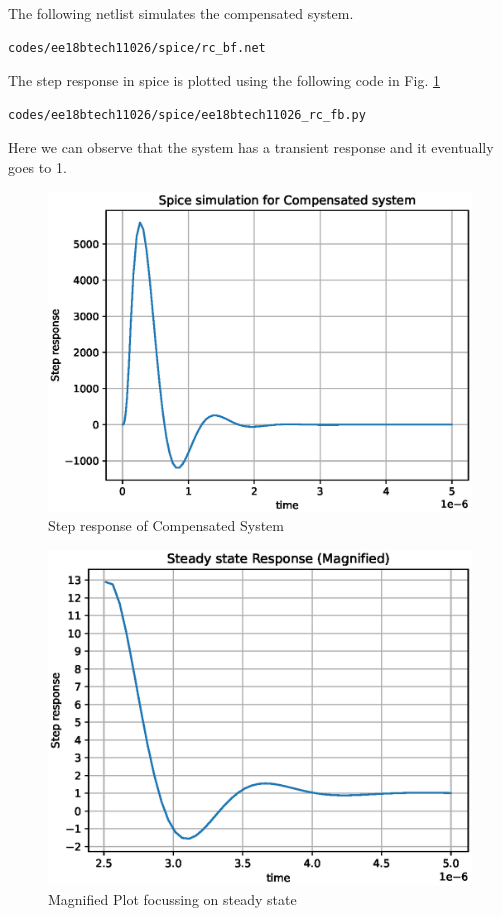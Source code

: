 \begin{enumerate}[label=\arabic*.,ref=\theenumi]
The following netlist simulates the compensated system.
   \begin{lstlisting}
codes/ee18btech11026/spice/rc_bf.net
\end{lstlisting}
 The step response in spice is plotted using the following code in Fig. \ref{fig:ee18btech11026_rc_fb}
 \begin{lstlisting}
codes/ee18btech11026/spice/ee18btech11026_rc_fb.py
\end{lstlisting}
Here we can observe that the system has a transient response and it eventually  goes to 1.
\begin{figure}[!h]
    \centering
    \includegraphics[width=\columnwidth]{./figs/ee18btech11026/ee18btech11026_spice_result_rc_bf.eps}
    \caption{Step response of Compensated System}
    \label{fig:ee18btech11026_rc_fb}
\end{figure}


\begin{figure}[!h]
    \centering
    \includegraphics[width=\columnwidth]{./figs/ee18btech11026/ee18btech11026_spice_result_rc_bf_mag.eps}
    \caption{Magnified Plot focussing on steady state}
    \label{fig:ee18btech11026_rc_fb_mag}
\end{figure}



\end{enumerate}
